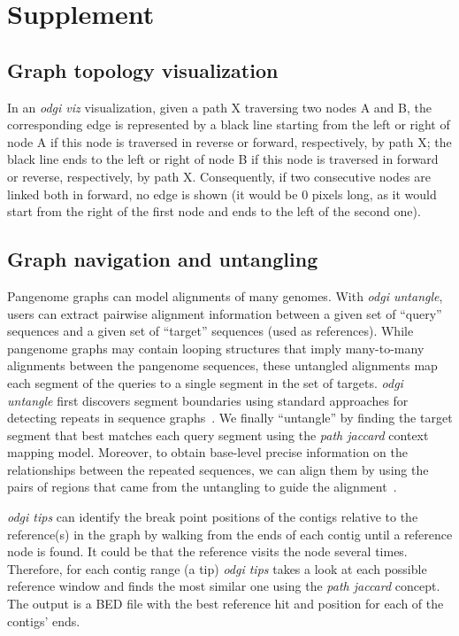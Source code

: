 \documentclass{bioinfo}
\newcommand{\beginsupplement}{%
    \renewcommand{\thesection}{S}
	\setcounter{table}{0}
	\renewcommand{\thetable}{S\arabic{table}}%
	\setcounter{figure}{0}
	\renewcommand{\thefigure}{S\arabic{figure}}%
}
\begin{document}
\clearpage
\beginsupplement

\section{Supplement}

\subsection{Graph topology visualization}
\label{sec:supp_visualization}
In an \textit{odgi viz} visualization, given a path X traversing two nodes A and B, the corresponding edge is represented by a black line starting from the left or right of node A if this node is traversed in reverse or forward, respectively, by path X;
the black line ends to the left or right of node B if this node is traversed in forward or reverse, respectively, by path X.
Consequently, if two consecutive nodes are linked both in forward, no edge is shown (it would be 0 pixels long, as it would start from the right of the first node and ends to the left of the second one).

\subsection{Graph navigation and untangling}
\label{sec:supp_navigation}
Pangenome graphs can model alignments of many genomes.
With \textit{odgi untangle}, users can extract pairwise alignment information between a given set of ``query'' sequences and a given set of ``target'' sequences (used as references).
While pangenome graphs may contain looping structures that imply many-to-many alignments between the pangenome sequences, these untangled alignments map each segment of the queries to a single segment in the set of targets.
\textit{odgi untangle} first discovers segment boundaries using standard approaches for detecting repeats in sequence graphs~\citep{Pevzner_2004}.
We finally ``untangle'' by finding the target segment that best matches each query segment using the \textit{path jaccard} context mapping model.
Moreover, to obtain base-level precise information on the relationships between the repeated sequences, we can align them by using the pairs of regions that came from the untangling to guide the alignment~\citep{wfmash}.

\textit{odgi tips} can identify the break point positions of the contigs relative to the reference(s) in the graph by walking from the ends of each contig until a reference node is found.
It could be that the reference visits the node several times. Therefore, for each contig range (a tip) \textit{odgi tips} takes a look at each possible reference window and finds the most similar one using the \textit{path jaccard} concept.
The output is a BED file with the best reference hit and position for each of the contigs' ends.
\end{document}
